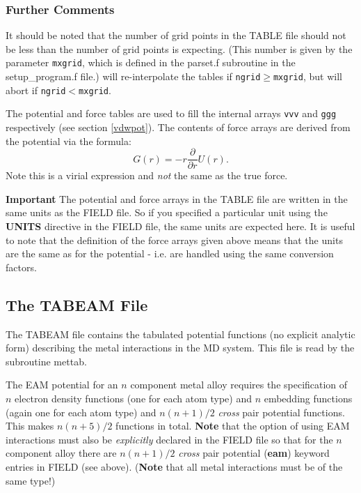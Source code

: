 \subsubsection{Further Comments}

It should be noted that the number of grid points in the TABLE file
should not be less than the number of grid points \D{} is expecting.
(This number is given by the parameter {\tt mxgrid}, which is defined
in the {\sc parset.f} subroutine in the {\sc setup\_program.f} file.)
\D{} will re-interpolate the tables if {\tt ngrid}$\ge${\tt mxgrid}, but will
abort if {\tt ngrid}$<${\tt mxgrid}.

The potential and force tables are used to fill the internal arrays
{\tt vvv} and {\tt ggg} respectively (see section \ref{vdwpot}). The
contents of force arrays are derived from the potential via the
formula:
\[
G(r)=-r\frac{\partial}{\partial r}U(r).
\]
Note this is a virial expression and {\em not} the same as the true force.

{\bf Important} The potential and force arrays in the TABLE file are
written in the same units as the FIELD file. So if you specified a
particular unit using the {\bf UNITS} directive in the FIELD file, the
same units are expected here. It is useful to note that the definition
of the force arrays given above means that the units are the same as
for the potential - i.e. are handled using the same conversion factors.

\subsection{The TABEAM File}
\label{tabeam-file}
The TABEAM file contains the tabulated potential functions (no explicit
analytic form) describing the  
metal
interactions in the MD system.  This file is read by the subroutine
{\sc mettab}.

The EAM potential for an $n$ component metal alloy requires the
specification of $n$ electron density functions (one for each atom type)
and $n$ embedding functions (again one for each atom type) and
$n(n+1)/2$ {\it cross} pair potential functions.  This makes $n(n+5)/2$
functions in total.  {\bf Note} that the option of using 
EAM 
interactions must also be {\it explicitly} declared in the FIELD file
so that for the $n$ component alloy there are $n(n+1)/2$ {\it cross} pair
potential ({\bf eam}) keyword entries in FIELD (see above).  ({\bf Note}
that all metal interactions must be of the same type!)


